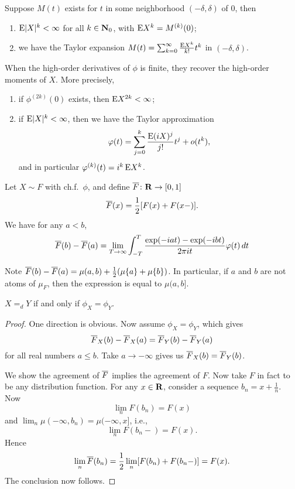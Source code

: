 \begin{namedthm}
    Suppose $M(t)$ exists for $t$ in some neighborhood $(-\delta,\delta)$ of $0$, then \begin{enumerate}
        \item $\mathop{}\!\mathrm{E} \lvert X \rvert^k < \infty$ for all $k\in \mathbf{N}_0$, with $\mathop{}\!\mathrm{E} X^k = M^{(k)}(0)$;
        \item we have the Taylor expansion $M(t) = \sum_{k=0}^\infty \frac{\mathop{}\!\mathrm{E} X^k}{k!} t^k$ in $(-\delta,\delta)$.
    \end{enumerate}
\end{namedthm}

\begin{namedthm} \leavevmode
When the high-order derivatives of $\phi$ is finite, they recover the high-order moments of $X$. More precisely, 
    \begin{enumerate}
        \item if $\phi^{(2k)}(0)$ exists, then $\mathop{}\!\mathrm{E} X^{2k} < \infty$;
        \item if $\mathop{}\!\mathrm{E} \lvert X \rvert^k <\infty$, then we have the Taylor approximation \[
            \varphi(t) = \sum_{j=0}^k\frac{\mathop{}\!\mathrm{E} (iX)^j}{j!} t^j + o(t^k),
        \] and in particular $\varphi^{(k)}(t) = i^k \mathop{}\!\mathrm{E} X^k$.
    \end{enumerate}
\end{namedthm}

\begin{namedthm}
    Let $X \sim F$ with ch.f.\ $\phi$, and define $\overline{F}\colon \mathbf{R} \to [0,1]$ \[
        \overline{F}(x) = \frac{1}{2}[F(x) + F(x-)].
    \]
    We have for any $a < b$, \[
         \overline{F}(b) - \overline{F}(a)= \lim_{T \to \infty} \int_{-T}^T \frac{\exp(-iat) - \exp(-ibt)}{2\pi it} \varphi(t)\,dt
    \]
\end{namedthm}
Note $\overline{F}(b) - \overline{F}(a) = \mu(a,b) + \frac{1}{2}(\mu\{a\}+\mu\{b\})$. In particular, if $a$ and $b$ are not atoms of $\mu_F$, then the expression is equal to $\mu(a,b]$.

\begin{thm}
    $X=_d Y$ if and only if $\phi_X = \phi_Y$.
\end{thm}
\begin{proof}
    One direction is obvious. Now assume $\phi_X = \phi_Y$, which gives \[
        \overline{F}_X(b) - \overline{F}_X(a) = \overline{F}_Y(b) - \overline{F}_Y(a)
    \] for all real numbers $a \leq b$. Take $a \to -\infty$ gives us $\overline{F}_X(b) = \overline{F}_Y(b)$.
    
    We show the agreement of $\overline{F}$ implies the agreement of $F$. Now take $F$ in fact to be any distribution function.
    For any $x\in \mathbf{R}$, consider a sequence $b_n = x+ \frac{1}{n}$. Now \[
        \lim_{n} F(b_n) = F(x)
    \] and $
        \lim_{n} \mu(-\infty, b_n) = \mu(-\infty, x]
    $, i.e., \[\lim_n F(b_n - ) = F(x).\] Hence \[
        \lim_{n} \overline{F}(b_n) = \frac{1}{2} \lim_{n} [F(b_n) + F(b_n-)] = F(x).
    \] The conclusion now follows.
\end{proof}

